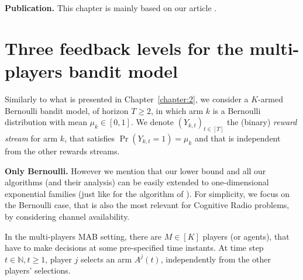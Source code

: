\textbf{Publication.}
%
This chapter is mainly based on our article \cite{Besson2018ALT}.


\section{Three feedback levels for the multi-players bandit model}
\label{sec:5:model}

Similarly to what is presented in Chapter~\ref{chapter:2},
we consider a $K$-armed Bernoulli bandit model, %
of horizon $T \geq 2$,
in which arm $k$ is a Bernoulli distribution with mean $\mu_k\in[0,1]$.
We denote $(Y_{k,t})_{t\in[T]}$ the \iid{} (binary) \emph{reward stream} for arm $k$, that satisfies $\Pr(Y_{k,t}=1) = \mu_k$ and that is independent from the other rewards streams.

\textbf{Only Bernoulli.}
However we mention that our lower bound and all our algorithms (and their analysis) can be easily extended to one-dimensional exponential families (just like for the \klUCB{} algorithm of \cite{KLUCBJournal}). For simplicity, we focus on the Bernoulli case, that is also the most relevant for Cognitive Radio problems, by considering channel availability.





In the multi-players MAB setting, there are $M \in [K]$ players (or agents),
that have to make decisions at some pre-specified time instants.
At time step $t \in\mathbb{N},t\geq1$, player $j$ selects an arm $A^j(t)$, independently from the other players' selections.

